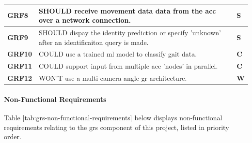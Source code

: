 \begin{scriptsize}
\begin{longtable}[H]{|p{}|p{}|p{}|}
        \textbf{GRF8}  & SHOULD receive movement data data from the \ac{acc} over a network connection.                     & \cellcolor{orange!10} \textbf{S} \\ \hline
        \textbf{GRF9}  & SHOULD dispay the identity prediction or specify 'unknown' after an identificaiton query is made.  & \cellcolor{orange!10} \textbf{S} \\ \hline
        \textbf{GRF10} & COULD use a trained \ac{ml} model to classify gait data.                                           & \cellcolor{yellow!10} \textbf{C} \\ \hline
        \textbf{GRF11} & COULD support input from multiple \ac{acc} 'nodes' in parallel.                                    & \cellcolor{yellow!10} \textbf{C} \\ \hline
        \textbf{GRF12} & WON'T use a multi-camera-angle \ac{gr} architecture.                                               & \cellcolor{green!10} \textbf{W}  \\ 
    \end{longtable}
\end{scriptsize}

\paragraph{Non-Functional Requirements} Table \ref{tab:grs-non-functional-requirements} below displays non-functional requirements relating to the \ac{grs} component of this project, listed in priority order.

